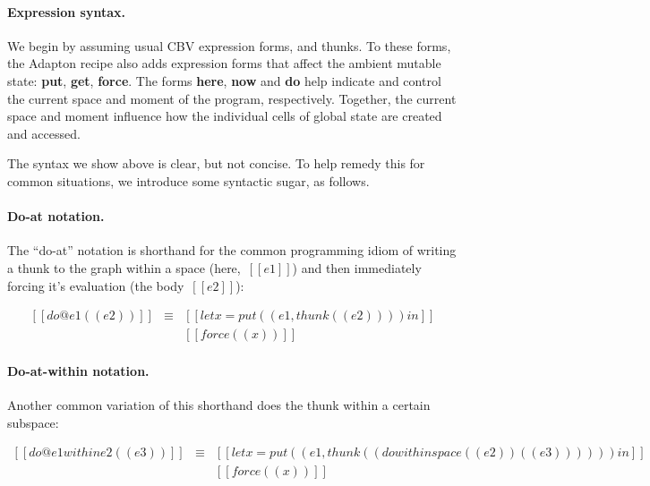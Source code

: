 \documentclass[11pt]{article}
\begin{document}
\paragraph{Expression syntax.}

We begin by assuming usual CBV expression forms, and thunks.
%
To these forms, the Adapton recipe also adds expression forms that
affect the ambient mutable state: \textbf{put}, \textbf{get}, \textbf{force}.
%
The forms \textbf{here}, \textbf{now} and \textbf{do} help indicate
and control the current space and moment of the program, respectively.
%
Together, the current space and moment influence how the individual
cells of global state are created and accessed.

\ottgrammartabular{
  \otte
}

\ottgrammartabular{
  \ottC
  \\
  \ottCxtVerb
  \\
  \ottCxtDim
}

\noindent
The syntax we show above is clear, but not concise.
%
To help remedy this for common situations, we introduce some syntactic sugar, as follows.

\paragraph{Do-at notation.}

The ``do-at'' notation is shorthand for the common programming idiom
of writing a thunk to the graph within a space (here,~$[[e1]]$) and then
immediately forcing it's evaluation (the body~$[[e2]]$):

\[
\begin{array}{lcl}
  [[do @e1 ({( e2 )}) ]]
  &\equiv&
  [[let x = put((e1, thunk((e2)))) in]]
  \\
  &&[[force((x))]]
\end{array}
\]

\paragraph{Do-at-within notation.}
Another common variation of this shorthand does the thunk within a
certain subspace:

\[
\begin{array}{lcl}
  [[do @e1 within e2 ({( e3 )})]]
  &\equiv&
  [[let x = put((e1, thunk((do within space ((e2))({(e3)}) )))) in]]
  \\
  &&[[force((x))]]
\end{array}
\]
\end{document}
